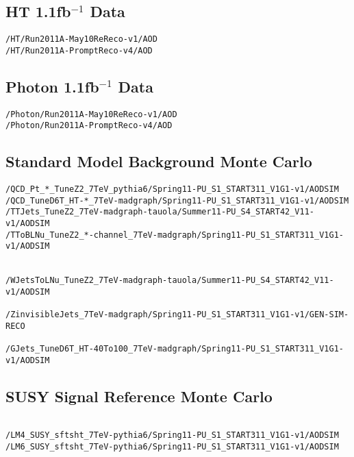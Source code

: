 \chapter{}
\section*{HT 1.1fb$^{-1}$ Data}
\begin{verbatim}
/HT/Run2011A-May10ReReco-v1/AOD
/HT/Run2011A-PromptReco-v4/AOD
\end{verbatim}
\section*{Photon 1.1fb$^{-1}$ Data}
\begin{verbatim}
/Photon/Run2011A-May10ReReco-v1/AOD
/Photon/Run2011A-PromptReco-v4/AOD
\end{verbatim}
\section*{Standard Model Background Monte Carlo}
\fontsize{10}{12}
\begin{verbatim}
/QCD_Pt_*_TuneZ2_7TeV_pythia6/Spring11-PU_S1_START311_V1G1-v1/AODSIM
/QCD_TuneD6T_HT-*_7TeV-madgraph/Spring11-PU_S1_START311_V1G1-v1/AODSIM
/TTJets_TuneZ2_7TeV-madgraph-tauola/Summer11-PU_S4_START42_V11-v1/AODSIM
/TToBLNu_TuneZ2_*-channel_7TeV-madgraph/Spring11-PU_S1_START311_V1G1-v1/AODSIM


/WJetsToLNu_TuneZ2_7TeV-madgraph-tauola/Summer11-PU_S4_START42_V11-v1/AODSIM

/ZinvisibleJets_7TeV-madgraph/Spring11-PU_S1_START311_V1G1-v1/GEN-SIM-RECO

/GJets_TuneD6T_HT-40To100_7TeV-madgraph/Spring11-PU_S1_START311_V1G1-v1/AODSIM

\end{verbatim}
\normalsize
\section*{SUSY Signal Reference Monte Carlo}
\fontsize{10}{12}
\begin{verbatim}

/LM4_SUSY_sftsht_7TeV-pythia6/Spring11-PU_S1_START311_V1G1-v1/AODSIM
/LM6_SUSY_sftsht_7TeV-pythia6/Spring11-PU_S1_START311_V1G1-v1/AODSIM
\end{verbatim}
\normalsize

